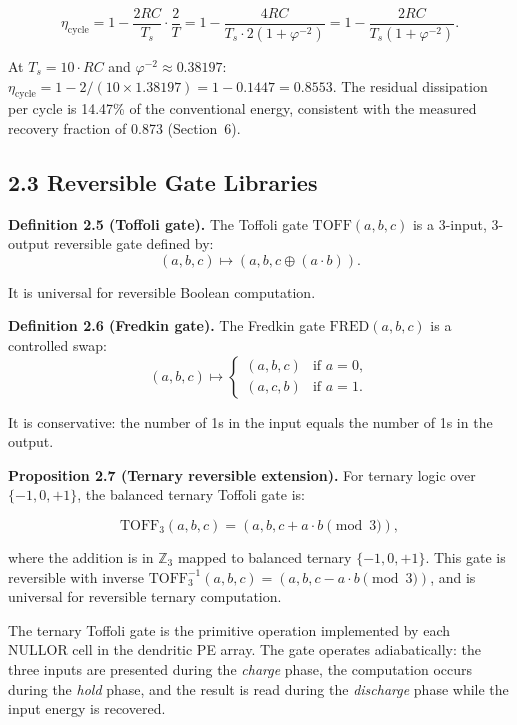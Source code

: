 \[
\eta_{\text{cycle}} = 1 - \frac{2RC}{T_s} \cdot \frac{2}{T}
= 1 - \frac{4RC}{T_s \cdot 2(1 + \varphi^{-2})}
= 1 - \frac{2RC}{T_s (1 + \varphi^{-2})}.
\]

At \(T_s = 10 \cdot RC\) and \(\varphi^{-2} \approx 0.38197\):
\(\eta_{\text{cycle}} = 1 - 2/(10 \times 1.38197) = 1 - 0.1447 =
0.8553\). The residual dissipation per cycle is 14.47\% of the
conventional energy, consistent with the measured recovery fraction of
0.873 (Section~6).

\subsection{2.3 Reversible Gate Libraries}

\textbf{Definition 2.5 (Toffoli gate).} The Toffoli gate
\(\text{TOFF}(a, b, c)\) is a 3-input, 3-output reversible gate
defined by:
\[
(a, b, c) \mapsto (a, b, c \oplus (a \cdot b)).
\]

It is universal for reversible Boolean computation.

\textbf{Definition 2.6 (Fredkin gate).} The Fredkin gate
\(\text{FRED}(a, b, c)\) is a controlled swap:
\[
(a, b, c) \mapsto \begin{cases}
(a, b, c) & \text{if } a = 0, \\
(a, c, b) & \text{if } a = 1.
\end{cases}
\]

It is conservative: the number of 1s in the input equals the number
of 1s in the output.

\textbf{Proposition 2.7 (Ternary reversible extension).} For ternary
logic over \(\{-1, 0, +1\}\), the balanced ternary Toffoli gate is:

\[
\text{TOFF}_3(a, b, c) = (a, b, c + a \cdot b \pmod{3}),
\]

where the addition is in \(\mathbb{Z}_3\) mapped to balanced ternary
\(\{-1, 0, +1\}\). This gate is reversible with inverse
\(\text{TOFF}_3^{-1}(a, b, c) = (a, b, c - a \cdot b \pmod{3})\),
and is universal for reversible ternary computation.

The ternary Toffoli gate is the primitive operation implemented by
each NULLOR cell in the dendritic PE array. The gate operates
adiabatically: the three inputs are presented during the \emph{charge}
phase, the computation occurs during the \emph{hold} phase, and the
result is read during the \emph{discharge} phase while the input
energy is recovered.

